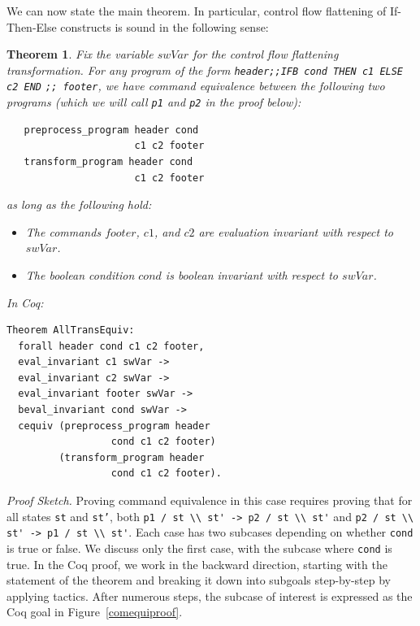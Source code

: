 \documentclass[compsoc,conference,a4paper,10pt,times]{IEEEtran}
\newtheorem{theorem}{Theorem}[section]
\begin{document}
We can now state the main theorem. In particular, control flow flattening of If-Then-Else constructs is sound in the following sense:
\begin{theorem}\label{maintheo}
Fix the variable $swVar$ for the control flow flattening transformation.  
For any program of the form \verb$header;;IFB cond THEN c1 ELSE c2 END$ \verb$;; footer$, we have command equivalence between the following two programs (which we will call \texttt{p1} and \texttt{p2} in the proof below):
\begin{verbatim}
   preprocess_program header cond
                      c1 c2 footer
   transform_program header cond
                      c1 c2 footer
\end{verbatim}

as long as the following hold:
\begin{itemize}
    \item The commands $footer$, $c1$, and $c2$ are evaluation invariant with respect to $swVar$.
    \item The boolean condition $cond$ is boolean invariant with respect to $swVar$.
\end{itemize}
In Coq:
\begin{verbatim}
Theorem AllTransEquiv:
  forall header cond c1 c2 footer, 
  eval_invariant c1 swVar -> 
  eval_invariant c2 swVar -> 
  eval_invariant footer swVar ->
  beval_invariant cond swVar ->
  cequiv (preprocess_program header
                  cond c1 c2 footer) 
         (transform_program header
                  cond c1 c2 footer).
\end{verbatim}
\end{theorem}
\emph{Proof Sketch.}
Proving command equivalence in this case requires proving that for all states \texttt{st} and \texttt{st'}, both \verb|p1 / st \\ st' -> p2 / st \\ st'| and \verb|p2 / st \\ st' -> p1 / st \\ st'|.  Each case has two subcases depending on whether \texttt{cond} is true or false.  We discuss only the first case, with the subcase where \texttt{cond} is true.  In the Coq proof, we work in the backward direction, starting with the statement of the theorem and breaking it down into subgoals step-by-step by applying tactics.  After numerous steps, the subcase of interest is expressed as the Coq goal in Figure~\ref{comequiproof}.
\end{document}
